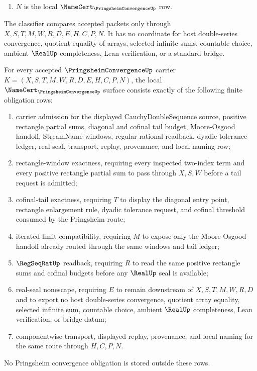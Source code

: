\begin{definition}
\begin{enumerate}
\item $N$ is the local $\NameCert_{\PringsheimConvergenceUp}$ row.
\end{enumerate}
The classifier compares accepted packets only through $X,S,T,M,W,R,D,E,H,C,P,N$. It has no coordinate for host double-series convergence, quotient equality of arrays, selected infinite sums, countable choice, ambient $\RealUp$ completeness, Lean verification, or a standard bridge.
\end{definition}

\begin{theorem}
\label{thm:pringsheim-convergence-namecert-obligations}
For every accepted $\PringsheimConvergenceUp$ carrier $K=(X,S,T,M,W,R,D,E,H,C,P,N)$, the local $\NameCert_{\PringsheimConvergenceUp}$ surface consists exactly of the following finite obligation rows:
\begin{enumerate}
\item carrier admission for the displayed CauchyDoubleSequence source, positive rectangle partial sums, diagonal and cofinal tail budget, Moore-Osgood handoff, StreamName windows, regular rational readback, dyadic tolerance ledger, real seal, transport, replay, provenance, and local naming row;
\item rectangle-window exactness, requiring every inspected two-index term and every positive rectangle partial sum to pass through $X,S,W$ before a tail request is admitted;
\item cofinal-tail exactness, requiring $T$ to display the diagonal entry point, rectangle enlargement rule, dyadic tolerance request, and cofinal threshold consumed by the Pringsheim route;
\item iterated-limit compatibility, requiring $M$ to expose only the Moore-Osgood handoff already routed through the same windows and tail ledger;
\item $\RegSeqRatUp$ readback, requiring $R$ to read the same positive rectangle sums and cofinal budgets before any $\RealUp$ seal is available;
\item real-seal nonescape, requiring $E$ to remain downstream of $X,S,T,M,W,R,D$ and to export no host double-series convergence, quotient array equality, selected infinite sum, countable choice, ambient $\RealUp$ completeness, Lean verification, or bridge datum;
\item componentwise transport, displayed replay, provenance, and local naming for the same route through $H,C,P,N$.
\end{enumerate}
No Pringsheim convergence obligation is stored outside these rows.
\end{theorem}
